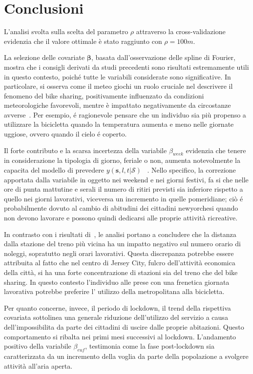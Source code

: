 \section{Conclusioni}
L'analisi svolta sulla scelta del parametro $\rho$ attraverso la cross-validazione evidenzia che il valore ottimale è stato raggiunto con $\rho = 100 m$.
\par La selezione delle covariate $\boldsymbol{\beta}$, basata dall'osservazione delle spline di Fourier, mostra che i consigli derivati da studi precedenti sono risultati estremamente utili in questo contesto, poiché tutte le variabili considerate sono significative. In particolare, si osserva come il meteo giochi un ruolo cruciale nel descrivere il fenomeno del bike sharing, positivamente influenzato da condizioni meteorologiche favorevoli, mentre è impattato negativamente da circostanze avverse~\citep{paper_bike_sharing_e_meteo}. Per esempio, é ragionevole pensare che un individuo sia più propenso a utilizzare la bicicletta quando la temperatura aumenta e meno nelle giornate uggiose, ovvero quando il cielo é coperto.
\par Il forte contributo e la scarsa incertezza della variabile $\beta_{week}$ evidenzia che tenere in considerazione la tipologia di giorno, feriale o non, aumenta notevolmente la capacita del modello di prevedere $y(\mathbf{s}, l, t| \mathcal{S})$ ~\citep{paper_bike_sharing_Otto}. Nello specifico, la correzione apportata dalla variabile in oggetto nei weekend e nei giorni festivi, fa si che nelle ore di punta mattutine e serali il numero di ritiri previsti sia inferiore rispetto a quello nei giorni lavorativi, viceversa un incremento in quelle pomeridiane; ciò é probabilmente dovuto al cambio di abitudini dei cittadini newyorchesi quando non devono lavorare e possono quindi dedicarsi alle proprie attività ricreative.
\par  In contrasto con i risultati di~\cite{paper_bike_sharing_e_meteo}, le analisi portano a concludere che la distanza dalla stazione del treno più vicina ha un impatto negativo sul numero orario di noleggi, sopratutto negli orari lavorativi. Questa discrepanza potrebbe essere attribuita al fatto che nel centro di Jersey City, fulcro dell'attività economica della città, si ha una forte concentrazione di stazioni sia del treno che del bike sharing. In questo contesto l'individuo alle prese con una frenetica giornata lavorativa potrebbe preferire l' utilizzo della metropolitana alla bicicletta.
\par Per quanto concerne, invece, il periodo di lockdown, il trend della rispettiva covariata sottolinea una generale riduzione dell'utilizzo del servizio a causa dell'impossibilita da parte dei cittadini di uscire dalle proprie abitazioni. Questo comportamento si ribalta nei primi mesi successivi al lockdown. L'andamento positivo della variabile $\beta_{euf}$, testimonia come la fase post-lockdown sia caratterizzata da un incremento della voglia da parte della popolazione a svolgere attività all'aria aperta.
